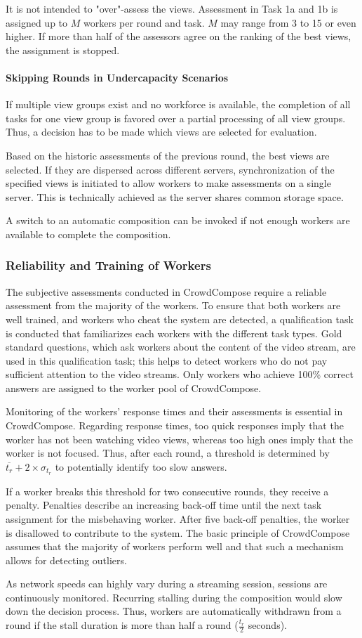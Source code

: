 It is not intended to "over"-assess the views. 
Assessment in Task 1a and 1b is assigned up to $M$ workers per round and task. 
$M$ may range from 3 to 15 or even higher. 
If more than half of the assessors agree on the ranking of the best views, the assignment is stopped.
\paragraph{Skipping Rounds in Undercapacity Scenarios}
If multiple view groups exist and no workforce is available, the completion of all tasks for one view group is favored over a partial processing of all view groups.  
Thus, a decision has to be made which views are selected for evaluation. 

Based on the historic assessments of the previous round, the best views are selected. 
If they are dispersed across different servers, synchronization of the specified views is initiated to allow workers to make assessments on a single server. This is technically achieved as the server shares common storage space.

A switch to an automatic composition can be invoked if not enough workers are available to complete the composition. 
\subsubsection{Reliability and Training of Workers}
\label{sec:620_reliability}
The subjective assessments conducted in CrowdCompose require a reliable assessment from the majority of the workers. 
To ensure that both workers are well trained, and workers who cheat the system are detected, a qualification task is conducted that familiarizes each workers with the different task types. 
Gold standard questions, which ask workers about the content of the video stream, are used in this qualification task; this helps to detect workers who do not pay sufficient attention to the video streams. 
Only workers who achieve 100\% correct answers are assigned to the worker pool of CrowdCompose.

Monitoring of the workers' response times and their assessments is essential in CrowdCompose. 
Regarding response times, too quick responses imply that the worker has not been watching video views, whereas too high ones imply that the worker is not focused. 
Thus, after each round, a threshold is determined by $\overline{t_r} + 2 \times \sigma_{t_r}$ to potentially identify too slow answers. 

If a worker breaks this threshold for two consecutive rounds, they receive a penalty.
Penalties describe an increasing back-off time until the next task assignment for the misbehaving worker. 
After five back-off penalties, the worker is disallowed to contribute to the system. 
The basic principle of CrowdCompose assumes that the majority of workers perform well and that such a mechanism allows for detecting outliers.

As network speeds can highly vary during a streaming session, sessions are continuously monitored. 
Recurring stalling during the composition would slow down the decision process. 
Thus, workers are automatically withdrawn from a round if the stall duration is more than half a round ($\frac{t_r}{2}$ seconds). 
